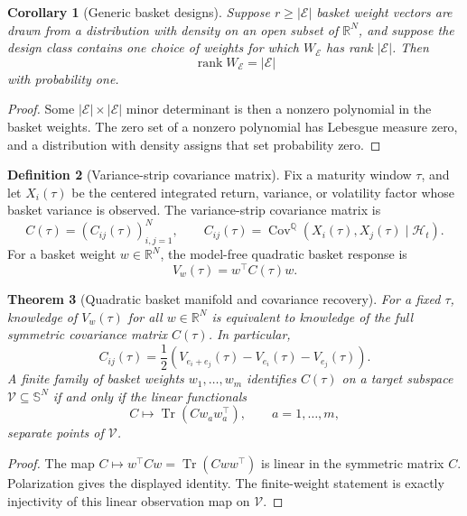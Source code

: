 \documentclass[11pt,a4paper]{amsart}
\theoremstyle{plain}
\newtheorem{theorem}{Theorem}[section]
\newtheorem{corollary}[theorem]{Corollary}
\theoremstyle{definition}
\newtheorem{definition}[theorem]{Definition}
\theoremstyle{remark}
\DeclareMathOperator{\Cov}{Cov}
\newcommand{\R}{\mathbb{R}}
\newcommand{\QQ}{\mathbb{Q}}
\newcommand{\cE}{\mathcal{E}}
\newcommand{\cH}{\mathcal{H}}
\begin{document}
\begin{corollary}[Generic basket designs]\label{cor:generic-basket-designs}
Suppose \(r\ge|\cE|\) basket weight vectors are drawn from a distribution with density on an
open subset of \(\R^N\), and suppose the design class contains one choice of weights for which
\(W_{\cE}\) has rank \(|\cE|\).  Then
\[
        \operatorname{rank}W_{\cE}=|\cE|
\]
with probability one.
\end{corollary}

\begin{proof}
Some \(|\cE|\times|\cE|\) minor determinant is then a nonzero polynomial in the basket weights.
The zero set of a nonzero polynomial has Lebesgue measure zero, and a distribution with density
assigns that set probability zero.
\end{proof}

\begin{definition}[Variance-strip covariance matrix]\label{def:variance-strip-covariance}
Fix a maturity window \(\tau\), and let \(X_i(\tau)\) be the centered integrated return,
variance, or volatility factor whose basket variance is observed.  The variance-strip covariance
matrix is
\[
        C(\tau)=(C_{ij}(\tau))_{i,j=1}^N,
        \qquad
        C_{ij}(\tau)=\Cov^\QQ(X_i(\tau),X_j(\tau)\mid\cH_t).
\]
For a basket weight \(w\in\R^N\), the model-free quadratic basket response is
\[
        V_w(\tau)=w^\top C(\tau)w.
\]
\end{definition}

\begin{theorem}[Quadratic basket manifold and covariance recovery]\label{thm:quadratic-basket-covariance}
For a fixed \(\tau\), knowledge of \(V_w(\tau)\) for all \(w\in\R^N\) is equivalent to knowledge
of the full symmetric covariance matrix \(C(\tau)\).  In particular,
\[
        C_{ij}(\tau)
        =
        \frac12\left(
        V_{e_i+e_j}(\tau)-V_{e_i}(\tau)-V_{e_j}(\tau)
        \right).
\]
A finite family of basket weights \(w_1,\dots,w_m\) identifies \(C(\tau)\) on a target subspace
\(\mathcal V\subseteq\mathbb S^N\) if and only if the linear functionals
\[
        C\mapsto \operatorname{Tr}(Cw_aw_a^\top),\qquad a=1,\dots,m,
\]
separate points of \(\mathcal V\).
\end{theorem}

\begin{proof}
The map \(C\mapsto w^\top Cw=\operatorname{Tr}(Cww^\top)\) is linear in the symmetric matrix
\(C\).  Polarization gives the displayed identity.  The finite-weight statement is exactly
injectivity of this linear observation map on \(\mathcal V\).
\end{proof}
\end{document}
